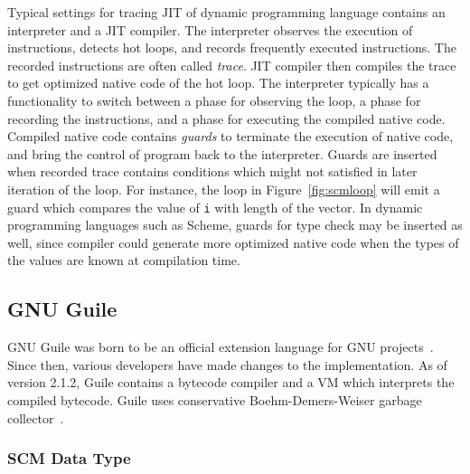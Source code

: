 \documentclass[preprint, 10pt]{sigplanconf}
\begin{document}
Typical settings for tracing JIT of dynamic programming language contains an
interpreter and a JIT compiler. The interpreter observes the execution of
instructions, detects hot loops, and records frequently executed
instructions. The recorded instructions are often called \textit{trace}. JIT
compiler then compiles the trace to get optimized native code of the hot
loop. The interpreter typically has a functionality to switch between a phase
for observing the loop, a phase for recording the instructions, and a phase
for executing the compiled native code.  Compiled native code contains
\textit{guards} to terminate the execution of native code, and bring the
control of program back to the interpreter. Guards are inserted when recorded
trace contains conditions which might not satisfied in later iteration of the
loop. For instance, the loop in
Figure~\hyperref[fig:scmloop]{\ref{fig:scmloop}} will emit a guard which
compares the value of \texttt{i} with length of the vector. In dynamic
programming languages such as Scheme, guards for type check may be inserted as
well, since compiler could generate more optimized native code when the types
of the values are known at compilation time.

\subsection{GNU Guile}
\label{sec:backgroundguile}

GNU Guile was born to be an official extension language for GNU
projects~\cite{Galassi02guilereference}. Since then, various developers have
made changes to the implementation. As of version 2.1.2, Guile contains a
bytecode compiler and a VM which interprets the compiled bytecode. Guile uses
conservative Boehm-Demers-Weiser garbage collector~\cite{boehm1988garbage}.


\subsubsection{SCM Data Type}
\label{sec:scmdatatype}
\end{document}
